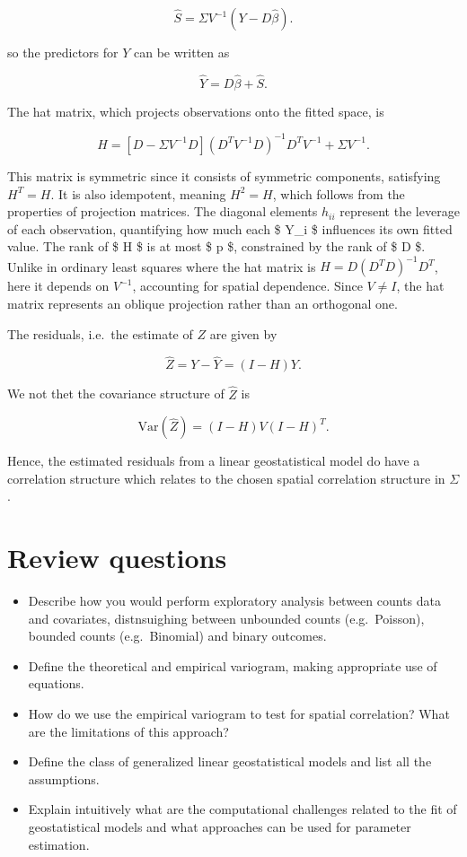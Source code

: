 \documentclass[
  letterpaper,
]{krantz}
\begin{document}
\[
\hat{S} = \Sigma V^{-1} (Y - D\hat{\beta}).
\]

so the predictors for \(Y\) can be written as

\[
\hat{Y} = D\hat{\beta} + \hat{S}.
\]

The hat matrix, which projects observations onto the fitted space, is

\[
H = [D - \Sigma V^{-1} D] (D^T V^{-1} D)^{-1} D^T V^{-1} + \Sigma V^{-1}.
\]

This matrix is symmetric since it consists of symmetric components,
satisfying \(H^T = H\). It is also idempotent, meaning \(H^2 = H\),
which follows from the properties of projection matrices. The diagonal
elements \(h_{ii}\) represent the leverage of each observation,
quantifying how much each \$ Y\_i \$ influences its own fitted value.
The rank of \$ H \$ is at most \$ p \$, constrained by the rank of \$ D
\$. Unlike in ordinary least squares where the hat matrix is
\(H = D (D^T D)^{-1} D^T\), here it depends on \(V^{-1}\), accounting
for spatial dependence. Since \(V \neq I\), the hat matrix represents an
oblique projection rather than an orthogonal one.

The residuals, i.e.~the estimate of \(Z\) are given by

\[
\hat{Z} = Y - \hat{Y} = (I - H) Y.
\]

We not thet the covariance structure of \(\hat{Z}\) is

\[
\text{Var}(\hat{Z}) = (I - H) V (I - H)^T.
\]

Hence, the estimated residuals from a linear geostatistical model do
have a correlation structure which relates to the chosen spatial
correlation structure in \(\Sigma\).

\section{Review questions}\label{review-questions-1}

\begin{itemize}
\item
  Describe how you would perform exploratory analysis between counts
  data and covariates, distnsuighing between unbounded counts
  (e.g.~Poisson), bounded counts (e.g.~Binomial) and binary outcomes.
\item
  Define the theoretical and empirical variogram, making appropriate use
  of equations.
\item
  How do we use the empirical variogram to test for spatial correlation?
  What are the limitations of this approach?
\item
  Define the class of generalized linear geostatistical models and list
  all the assumptions.
\item
  Explain intuitively what are the computational challenges related to
  the fit of geostatistical models and what approaches can be used for
  parameter estimation.
\end{itemize}
\end{document}
